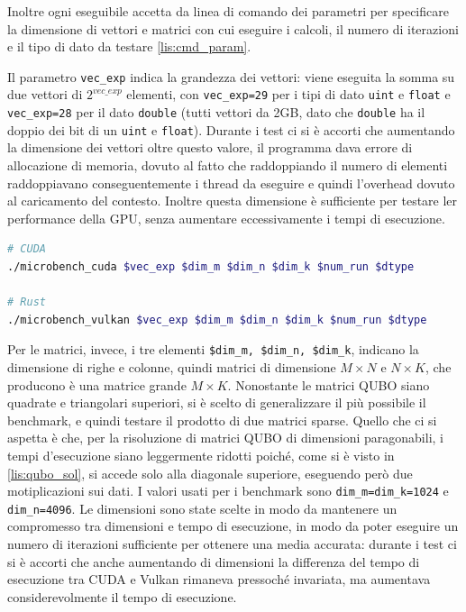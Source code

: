 Inoltre ogni eseguibile accetta da linea di comando dei parametri per specificare la dimensione di vettori e matrici con cui eseguire i calcoli, il numero di iterazioni e il tipo di dato da testare \ref{lis:cmd_param}.

Il parametro \verb|vec_exp| indica la grandezza dei vettori: viene eseguita la somma su due vettori di $2^{vec\_exp}$ elementi, con \verb|vec_exp=29| per i tipi di dato \verb|uint| e \verb|float| e \verb|vec_exp=28| per il dato \verb|double| (tutti vettori da 2GB, dato che \verb|double| ha il doppio dei bit di un \verb|uint| e \verb|float|). Durante i test ci si è accorti che aumentando la dimensione dei vettori oltre questo valore, il programma dava errore di allocazione di memoria, dovuto al fatto che raddoppiando il numero di elementi raddoppiavano conseguentemente i thread da eseguire e quindi l'overhead dovuto al caricamento del contesto. Inoltre questa dimensione è sufficiente per testare ler performance della GPU, senza aumentare eccessivamente i tempi di esecuzione.

\vspace{5mm}
\begin{lstlisting}[language=bash, caption=Esecuzione benchmark, label=lis:cmd_param]
# CUDA
./microbench_cuda $vec_exp $dim_m $dim_n $dim_k $num_run $dtype

# Rust
./microbench_vulkan $vec_exp $dim_m $dim_n $dim_k $num_run $dtype
\end{lstlisting}
\vspace{5mm}

Per le matrici, invece, i tre elementi \verb|$dim_m, $dim_n, $dim_k|, indicano la dimensione di righe e colonne, quindi matrici di dimensione $M \times N$ e $N \times K$, che producono è una matrice grande $M \times K$. Nonostante le matrici QUBO siano quadrate e triangolari superiori, si è scelto di generalizzare il più possibile il benchmark, e quindi testare il prodotto di due matrici sparse. Quello che ci si aspetta è che, per la risoluzione di matrici QUBO di dimensioni paragonabili, i tempi d'esecuzione siano leggermente ridotti poiché, come si è visto in \ref{lis:qubo_sol}, si accede solo alla diagonale superiore, eseguendo però due motiplicazioni sui dati. I valori usati per i benchmark sono \verb|dim_m=dim_k=1024| e \verb|dim_n=4096|. Le dimensioni sono state scelte in modo da mantenere un compromesso tra dimensioni e tempo di esecuzione, in modo da poter eseguire un numero di iterazioni sufficiente per ottenere una media accurata: durante i test ci si è accorti che anche aumentando di dimensioni la differenza del tempo di esecuzione tra CUDA e Vulkan rimaneva pressoché invariata, ma aumentava considerevolmente il tempo di esecuzione. 

